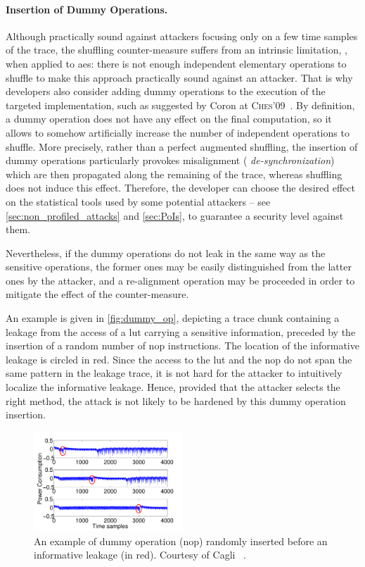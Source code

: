 \paragraph{Insertion of Dummy Operations.}
Although practically sound against attackers focusing only on a few time samples of the trace, the shuffling counter-measure suffers from an intrinsic limitation, \eg{}, when applied to \gls{aes}: there is not enough independent elementary operations to shuffle to make this approach practically sound against an attacker.
That is why developers also consider adding dummy operations to the execution of the targeted implementation, such as suggested by Coron \etal{} at \textsc{Ches}'09~\cite{coron_random_2009}.
By definition, a dummy operation does not have any effect on the final computation, so it allows to somehow artificially increase the number of independent operations to shuffle.
More precisely, rather than a perfect augmented shuffling, the insertion of dummy operations particularly provokes misalignment (\aka{} \emph{de-synchronization}) which are then propagated along the remaining of the trace, whereas shuffling does not induce this effect.
Therefore, the developer can choose the desired effect on the statistical tools used by some potential attackers -- see \autoref{sec:non_profiled_attacks} and \autoref{sec:PoIs}, to guarantee a security level against them.

Nevertheless, if the dummy operations do not leak in the same way as the sensitive operations, the former ones may be easily distinguished from the latter ones by the attacker, and a re-alignment operation may be proceeded in order to mitigate the effect of the counter-measure.

An example is given in \autoref{fig:dummy_op}, depicting a trace chunk containing a leakage from the access of a \gls{lut} carrying a sensitive information, preceded by the insertion of a random number of \textsf{nop} instructions.
The location of the informative leakage is circled in red.
Since the access to the \gls{lut} and the \textsf{nop} do not span the same pattern in the leakage trace, it is not hard for the attacker to intuitively localize the informative leakage.
Hence, provided that the attacker selects the right method, the attack is not likely to be hardened by this dummy operation insertion.

\begin{figure}
	\centering
	\includegraphics[width=0.5\textwidth]{CW-dataset/CW_shift_traces}
	\caption{An example of dummy operation (\textsf{nop}) randomly inserted before an informative leakage (in red). 
	Courtesy of Cagli \etal{}~\cite{cagli_convolutional_2017}.}
	\label{fig:dummy_op}
\end{figure}

